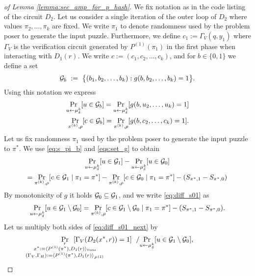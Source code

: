 \begin{proof}[of Lemma \ref{lemma:sec_amp_for_p_hash}]
We fix notation as in the code listing of the circuit $D_2$.
Let us consider a single iteration of the outer loop of $D_2$ where values $\pi_2, \dotsc, \pi_k$ are fixed.
We write $\pi_1$ to denote randomness used by the problem poser to generate the input puzzle.
Furthermore, we define $c_1 := \Gamma_V(q,y_1)$ where $\Gamma_V$ is the verification circuit generated
by $P^{(1)}(\pi_1)$ in the first phase when interacting with $D_1(r)$.
We write $c := (c_1, c_2, \dotsc, c_k)$, and for $b \in \{0,1\}$ we define a set
\begin{align*}
\mathcal{G}_{b}~:=~\big\{(b_1, b_2, \dots, b_k) : g(b, b_2, \dots, b_k) = 1 \big\}.
\end{align*}
Using this notation we express
\begin{align}
  \label{eqs:set_g}
  \underset{u \leftarrow \mu_{\delta}^k}{\Pr}[u \in \mathcal{G}_b] = \underset{u \leftarrow \mu_{\delta}^k}{\Pr}[g(b, u_2, \dots, u_k) = 1]\notag\\
 \underset{\pi^{(k)}, \rho}{\Pr}[c \in \mathcal{G}_b] = \underset{\pi^{(k)}, \rho}{\Pr}[g(b, c_2, \dots, c_k) = 1].
\end{align}
Let us fix randomness $\pi_1$ used by the problem poser to generate the input puzzle to $\pi^*$.
We use \eqref{eq:s_pi_b} and \eqref{eqs:set_g} to obtain
\begin{multline}
\label{eq:diff_s01}
\underset{u \leftarrow \mu_{\delta}^k}{\Pr}[u \in \mathcal{G}_1] - \underset{u \leftarrow \mu_{\delta}^k}{\Pr}[u \in \mathcal{G}_0] \\
 = \underset{\pi^{(k)}, \rho}{\Pr}[c \in \mathcal{G}_1 \mid \pi_1 = \pi^*] - \underset{\pi^{(k)}, \rho}{\Pr}[c \in \mathcal{G}_0 \mid \pi_1 = \pi^*] - (S_{\pi^*, 1} - S_{\pi^*,0})
\end{multline}
By monotonicity of $g$ it holds $\mathcal{G}_0 \subseteq \mathcal{G}_1$, and we write \eqref{eq:diff_s01} as
\begin{align}
  \label{eq:diff_s01_next}
  \underset{u \leftarrow \mu_{\delta}^k}{\Pr}[u \in \mathcal{G}_1 \setminus \mathcal{G}_0] = \underset{\pi^{(k)}, \rho}{\Pr}[c \in \mathcal{G}_1 \setminus \mathcal{G}_0 \mid \pi_1 = \pi^*] - (S_{\pi^*,1} - S_{\pi^*,0}).
\end{align}
Let us multiply both sides of \eqref{eq:diff_s01_next} by
\begin{align*}
\underset{
  \mathclap{
    \substack{r \\ x^* := \langle P^{(1)}(\pi^*), D_1(r) \rangle_{\mathit{trans}}
    \\ (\Gamma_V, \Gamma_H) := \langle P^{(1)}(\pi^*), D_1(r) \rangle_{P^{(1)}} }}}
{\Pr}\mkern13mu [\Gamma_V(D_2(x^*, r)) = 1]
 \mkern11mu / \underset{u \leftarrow \mu_{\delta}^k}{\Pr}[ u \in \cG_1 \setminus\cG_0],

\end{align*}
\end{proof}
